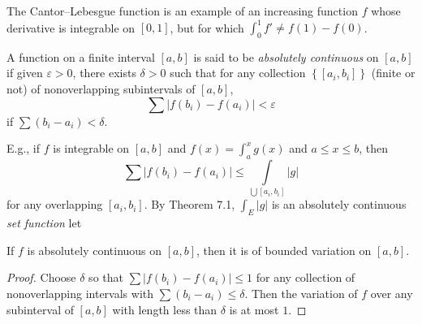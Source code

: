 The Cantor--Lebesgue function is an example of an increasing function $f$
whose derivative is integrable on $[0,1]$, but for which $\int_0^1 f'\neq
f(1)-f(0)$.

A function on a finite interval $[a,b]$ is said to be \emph{absolutely
  continuous} on $[a,b]$ if given $\varepsilon>0$, there exists $\delta>0$
such that for any collection $\left\{{[a_i,b_i]}\right\}$ (finite or not)
of nonoverlapping subintervals of $[a,b]$,
\[
\sum\left|f(b_i)-f(a_i)\right|<\varepsilon
\]
if $\sum(b_i-a_i)<\delta$.

E.g., if $f$ is integrable on $[a,b]$ and $f(x)=\int_a^x g(x)$ and $a\leq
x\leq b$, then
\[
\sum\left|f(b_i)-f(a_i)\right|\leq\int\limits_{\bigcup[a_i,b_i]}|g|
\]
for any overlapping $[a_i,b_i]$. By Theorem 7.1, $\int_E |g|$ is an
absolutely continuous \emph{set function} let

\begin{theorem}[7.27]
If $f$ is absolutely continuous on $[a,b]$, then it is of bounded variation
on $[a,b]$.
\end{theorem}
\begin{proof}
Choose $\delta$ so that $\sum |f(b_i)-f(a_i)|\leq 1$ for any collection of
nonoverlapping intervals with $\sum(b_i-a_i)\leq\delta$. Then the variation
of $f$ over any subinterval of $[a,b]$ with length less than $\delta$ is at
most $1$.
\end{proof}

